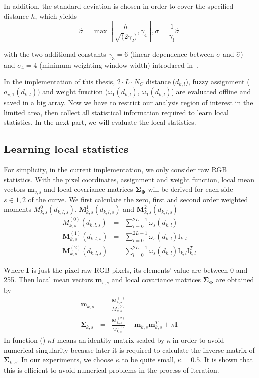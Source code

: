 In addition, the standard
deviation is chosen in order to cover the specified distance $h$,
which yields 
\begin{equation}
  \label{eq:deviation}
  \hat{\sigma} = \max \left[\frac{h}{\sqrt(2\gamma_2)}, \gamma_4
  \right], \sigma  = \frac{1}{\gamma_3} \hat{\sigma}
\end{equation}

with the two additional constants $\gamma_3 = 6$ (linear dependence
between $\sigma$ and $\hat{\sigma}$) and $\sigma_4 = 4$ (minimum
weighting window width) introduced in~\cite{panin2006efficient}. 

In the implementation of this thesis,
$2 \cdot L \cdot N_C$ distance ($d_{k,l}$), fuzzy assignment
($a_{v,1}(d_{k,l}))$ and weight function ($\omega_1(d_{k,l})$,
$\omega_1(d_{k,l})$) are evaluated offline and saved in a big
array. Now we have to restrict our analysis region of interest in the
limited area, then collect all statistical information required to learn
local statistics. In the next part, we will evaluate the local
statistics.

\subsection{Learning local statistics}
\label{sec:lls}

For simplicity, in the current implementation, we only consider raw RGB
statistics. With the pixel coordinates, assignment and weight
function, local mean vectors $\mathbf{m}_{v,s}$  and local covariance matrices
$\mathbf{\Sigma}_{\mathbf{\Phi}}$ will be derived for each side $s \in
{1,2}$ of the curve.
We first calculate the zero, first and second order weighted moments
$M_{k,s}^0(d_{k,l,s})$, $\mathbf{M}_{k,s}^1(d_{k,l,s})$ and $\mathbf{M}_{k,s}^2(d_{k,l,s})$
\begin{eqnarray}
  \label{eq:localm}
  M_{k,s}^{(0)}(d_{k,l,s}) &=& \sum_{l=0}^{2L-1} \omega_s(d_{k,l})\\
  \mathbf{M}_{k,s}^{(1)}(d_{k,l,s}) &=& \sum_{l=0}^{2L-1} \omega_s(d_{k,l}) \mathrm{I}_{k,l}\\
  \mathbf{M}_{k,s}^{(2)}(d_{k,l,s}) &=& \sum_{l=0}^{2L-1} \omega_s(d_{k,l}) \mathrm{I}_{k,l}\mathrm{I}_{k,l}^T
\end{eqnarray}

Where $\mathbf{I}$ is just the pixel raw RGB pixels, its elements'
value are between 0 and 255. Then local mean vectors $\mathbf{m}_{v,s}$  and local covariance matrices
$\mathbf{\Sigma}_{\mathbf{\Phi}}$  are obtained by 
\begin{eqnarray}
  \label{eq:localcov}
  \mathbf{m}_{k,s} &=& \frac{\mathbf{M}^{(1)}_{k,s}}{M^{(0)}_{k,s}}\\
  \mathbf{\Sigma}_{k,s} &=& \frac{\mathbf{M}^{(2)}_{k,s}}{M^{(0)}_{k,s}}
  - \mathbf{m}_{k,s}\mathbf{m}_{k,s}^T  + \kappa \mathbf{I}
\end{eqnarray}
In function () $\kappa I$  means an identity matrix scaled by
$\kappa$ in order to avoid numerical singularity because later it is
required to calculate the inverse matrix of
$\mathbf{\Sigma}_{k,s}$. In our experiments, we choose $\kappa$ to be
quite small, $\kappa = 0.5$. It is shown that this is efficient to
avoid numerical problems in the process of iteration.

